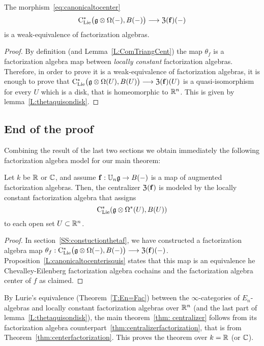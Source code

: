 \documentclass[11pt]{amsart}
\numberwithin{equation}{section}
\begin{document}
\begin{prp}\label{L:canonicaltocenterisquis} The morphism~\eqref{eq:canonicaltocenter}
\[{\rm C}_{\rm Lie}^*\big(\mathfrak g\otimes \Omega (-), B(-) \big) \longrightarrow  {\frak Z}(\mathbf{f})(-)\] is a weak-equivalence of factorization algebras. 
\end{prp}
\begin{proof}
By definition (and Lemma~\ref{L:ComTriangCent}) the map 
$\theta_f$ is a factorization algebra map between \emph{locally constant} factorization algebras. 
Therefore, in order to prove it is a weak-equivalence of factorization algebras, it is enough to prove that 
${\rm C}_{\rm Lie}^*\big(\mathfrak g\otimes \Omega (U), B(U) \big) \longrightarrow  {\frak Z}(\mathbf{f})(U)$ is a quasi-isomorphism for every $U$ which is a disk, that is 
homeomorphic to $\mathbb R^n$. This is given by lemma~\ref{L:thetaquisondisk}.
\end{proof}

\subsection{End of the proof}

Combining the result of the last two sections we obtain immediately the following factorization algebra model for our main theorem:
\begin{thm}\label{thm:centralizerfactorization}
Let $k$ be $\mathbb R$ or $\mathbb C$, and assume $\mathbf{f}:  \mathbb U_n \mathfrak g \to B(-)$ is a map of augmented factorization algebras. 
Then, the centralizer ${\frak Z}(\mathbf{f})$ is modeled by the locally constant factorization algebra that assigns
\[
{\rm C}_{\rm Lie}^*(\mathfrak g \otimes \Omega^*(U), B(U))
\]
to each open set $U \subset \mathbb R^n$. 
\end{thm}
\begin{proof}
 In section~\ref{SS:constuctionthetaf}, we have constructed a factorization algebra map 
 $\theta_f: {\rm C}_{\rm Lie}^*\big(\mathfrak g\otimes \Omega (-), B(-) \big) \longrightarrow  {\frak Z}(\mathbf{f})(-)$. Proposition~\ref{L:canonicaltocenterisquis} 
 states that this map is an equivalence he Chevalley-Eilenberg factorization algebra cochains and the factorization algebra center of $f$ as claimed.
\end{proof}

By Lurie's equivalence (Theorem~\ref{T:En=Fac}) between the $\infty$-categories of $E_n$-algebras and locally constant factorization algebras 
over $\mathbb R^n$ (and the last part of lemma~\ref{L:thetaquisondisk}),
the main theorem~\ref{thm: centralizer} follows from its factorization algebra counterpart~\ref{thm:centralizerfactorization}, 
that is from Theorem~\ref{thm:centerfactorization}. This proves the theorem over $k=\mathbb R$ (or $\mathbb C$). 
\end{document}
